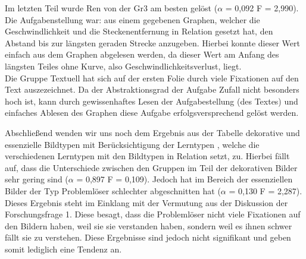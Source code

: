 Im letzten Teil wurde \gls{Ren} von der \gls{Gr3} am besten gelöst ($\alpha$ = 0,092 F = 2,990). Die Aufgabenstellung war: aus einem gegebenen Graphen, welcher die Geschwindlichkeit und die Steckenentfernung in Relation gesetzt hat, den Abstand bis zur längsten geraden Strecke anzugeben. Hierbei konnte dieser Wert einfach aus dem Graphen abgelesen werden, da dieser Wert am Anfang des längsten Teiles ohne Kurve, also Geschwindlichkeitsverlust, liegt. \\
Die Gruppe Textuell hat sich auf der ersten Folie durch viele Fixationen auf den Text auszezeichnet. Da der Abstraktionsgrad der Aufgabe Zufall nicht besonders hoch ist, kann durch gewissenhaftes Lesen der Aufgabestellung (des Textes) und einfaches Ablesen des Graphen diese Aufgabe erfolgsversprechend gelöst werden. 


Abschließend wenden wir uns noch dem Ergebnis aus der Tabelle \grqq dekorative und essenzielle Bildtypen mit Berücksichtigung der Lerntypen \grqq , welche die verschiedenen Lerntypen mit den Bildtypen in Relation setzt, zu. Hierbei fällt auf, dass die Unterschiede zwischen den Gruppen im Teil der dekorativen Bilder sehr gering sind ($\alpha$ = 0,897 F = 0,109). Jedoch hat im Bereich der essenziellen Bilder der Typ Problemlöser schlechter abgeschnitten hat ($\alpha$ = 0,130 F = 2,287).
Dieses Ergebnis steht im Einklang mit der Vermutung aus der Diskussion der Forschungsfrage 1. Diese besagt, dass die Problemlöser nicht viele Fixationen auf den Bildern haben, weil sie sie verstanden haben, sondern weil es ihnen schwer fällt sie zu verstehen. Diese Ergebnisse sind jedoch nicht signifikant und geben somit lediglich eine Tendenz an. 
